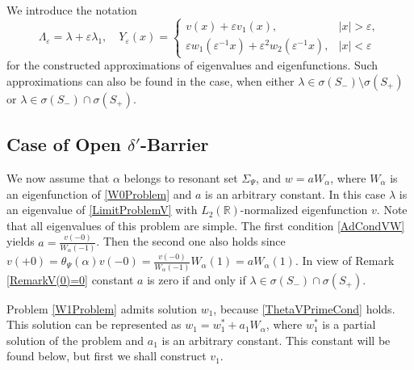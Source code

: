 \documentclass[11pt,english]{amsart}
\begin{document}
We introduce the notation
\begin{equation}\label{Approx}
    \Lambda_\varepsilon=\lambda +\varepsilon\lambda_1, \quad Y_\varepsilon(x)=
\begin{cases}
v (x)+\varepsilon v_1(x),  &{\left\vert{x}\right\vert}>\varepsilon,\\
 \varepsilon w_1(\varepsilon^{-1}x)+\varepsilon^2 w_2(\varepsilon^{-1}x),&{\left\vert{x}\right\vert}<\varepsilon
\end{cases}
\end{equation}
for the constructed approximations of  eigenvalues and eigenfunctions.
Such approximations can also be found  in the case, when either
$\lambda\in \sigma(S_-)\setminus\sigma(S_+)$ or $\lambda\in \sigma(S_-)\cap\sigma(S_+)$.

\subsection{Case of Open $\delta'$-Barrier}
 We now assume that  $\alpha$ belongs to  resonant set $\Sigma_\Psi$, and $w= a W_\alpha$, where  $W_\alpha$ is an eigenfunction of  \eqref{W0Problem} and $a$ is an arbitrary constant.
In this case $\lambda$ is an eigenvalue of \eqref{LimitProblemV} with
$L_2(\mathbb{R})$-normalized eigenfunction $v$.
Note that all eigenvalues of this problem are simple.
The first condition \eqref{AdCondVW} yields $a=\frac{v(-0)}{W_\alpha(-1)}$.
Then the second one also holds since
$ v(+0)=\theta_\Psi(\alpha)v(-0)=\frac{v(-0)}{W_\alpha(-1)}W_\alpha(1)=aW_\alpha(1)$.
In view of Remark \ref{RemarkV(0)=0}  constant $a$ is zero if and only if $\lambda\in \sigma(S_-)\cap\sigma(S_+)$.

Problem \eqref{W1Problem} admits  solution $w_1$, because \eqref{ThetaVPrimeCond} holds.
This solution can be represented as $w_1=w_1^*+a_1W_\alpha$, where $w_1^*$ is a partial solution of the problem and $a_1$ is an arbitrary constant.
This constant will be found below, but first we shall construct  $v_1$.
\end{document}
